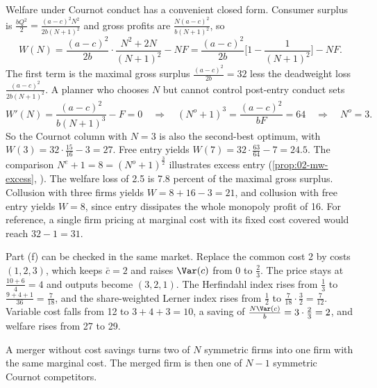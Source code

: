 Welfare under Cournot conduct has a convenient closed form. Consumer surplus is
$\frac{bQ^2}{2} = \frac{(a - c)^2N^2}{2b(N + 1)^2}$ and gross profits are $\frac{N(a - c)^2}{b(N + 1)^2}$, so
\begin{equation}\label{eq:C-welfare}
W(N) = \frac{(a - c)^2}{2b}\cdot\frac{N^2 + 2N}{(N + 1)^2} - NF
= \frac{(a - c)^2}{2b}\Big[1 - \frac{1}{(N + 1)^2}\Big] - NF .
\end{equation}
The first term is the maximal gross surplus $\frac{(a - c)^2}{2b} = 32$ less the deadweight loss
$\frac{(a - c)^2}{2b(N + 1)^2}$. A planner who chooses $N$ but cannot control post-entry conduct sets
\begin{equation*}
W'(N) = \frac{(a - c)^2}{b(N + 1)^3} - F = 0
\quad\Longrightarrow\quad
(N^o + 1)^3 = \frac{(a - c)^2}{bF} = 64
\quad\Longrightarrow\quad N^o = 3 .
\end{equation*}
So the Cournot column with $N = 3$ is also the second-best optimum, with $W(3) = 32\cdot\frac{15}{16} - 3 = 27$.
Free entry yields $W(7) = 32\cdot\frac{63}{64} - 7 = 24.5$. The comparison $N^e + 1 = 8 = (N^o + 1)^{\frac{3}{2}}$
illustrates excess entry (\cref{prop:02-mw-excess}, \citealp{MankiwWhinston1986}). The welfare loss of 2.5
is 7.8 percent of the maximal gross surplus. Collusion with three firms yields $W = 8 + 16 - 3 = 21$, and
collusion with free entry yields $W = 8$, since entry dissipates the whole monopoly profit of 16. For
reference, a single firm pricing at marginal cost with its fixed cost covered would reach $32 - 1 = 31$.

Part (f) can be checked in the same market. Replace the common cost 2 by costs $(1, 2, 3)$, which keeps
$\bar c = 2$ and raises $\Var(c)$ from 0 to $\frac{2}{3}$. The price stays at $\frac{10 + 6}{4} = 4$ and
outputs become $(3, 2, 1)$. The Herfindahl index rises from $\frac{1}{3}$ to
$\frac{9 + 4 + 1}{36} = \frac{7}{18}$, and the share-weighted Lerner index rises from $\frac{1}{2}$ to
$\frac{7}{18}\cdot\frac{3}{2} = \frac{7}{12}$. Variable cost falls from 12 to $3 + 4 + 3 = 10$, a saving of
$\frac{N\Var(c)}{b} = 3\cdot\frac{2}{3} = 2$, and welfare rises from 27 to 29.

A merger without cost savings turns two of $N$ symmetric firms into one firm with the same marginal cost. The
merged firm is then one of $N - 1$ symmetric Cournot competitors.


